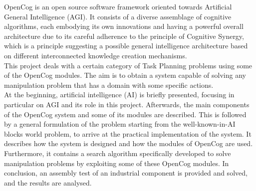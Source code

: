 
OpenCog is an open source software framework oriented towards Artificial General Intelligence (AGI).  It consists of a diverse assemblage of cognitive algorithms, each embodying its own innovations and having a powerful overall architecture due to its careful adherence to the principle of Cognitive Synergy, which is a principle suggesting a possible general intelligence architecture based on different interconnected knowledge creation mechanisms. \\
This project deals with a certain category of Task Planning problems using some of the OpenCog modules. 
The aim is to obtain a system capable of solving any manipulation problem that has a domain with some specific actions. \\
At the beginning, artificial intelligence (AI) is briefly presented, focusing in particular on AGI and its role in this project. Afterwards, the main components of the OpenCog system and some of its modules are described. This is followed by a general formulation of the problem starting from the well-known-in-AI blocks world problem, to arrive at the practical implementation of the system. It describes how the system is designed and how the modules of OpenCog are used. Furthermore, it contains a search algorithm specifically developed to solve manipulation problems by exploiting some of these OpenCog modules. In conclusion, an assembly test of an industrial component is provided and solved, and the results are analysed. \\